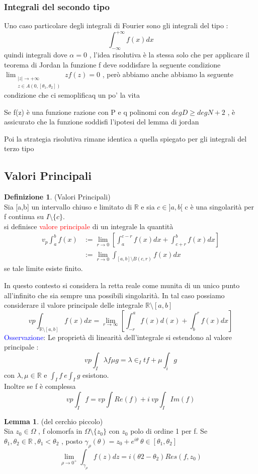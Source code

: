 \documentclass{article}
\theoremstyle{definition}
\newtheorem*{definizione}{Definizione}
\newtheorem*{lemma}{Lemma}
\newcommand{\R}{\mathbb{R}}
\newcommand{\la}{\lambda}
\newcommand{\intinf}{\int_{-\infty}^{+\infty}}
\begin{document}
\subsubsection{Integrali del secondo tipo}
Uno caso particolare degli integrali di Fourier sono gli integrali del tipo : 
$$\intinf f(x)dx$$ quindi integrali dove $\alpha=0$ , l'idea risolutiva è la stessa solo che per applicare il teorema di Jordan la funzione f deve soddisfare la seguente condizione  $\lim_{\substack{|z| \to +\infty \\ z \in A(0, [\theta_1, \theta_2])}}zf(z)=0$ , però abbiamo anche abbiamo la seguente condizione che ci semoplificaq un po' la vita 
\begin{tcolorbox}
	Se f(z) è una funzione razione con P e q polinomi con $deg D \geq deg N+2$ , è assicurato che la funzione soddisfi l'ipotesi del lemma di jordan 
\end{tcolorbox}
Poi la strategia risolutiva rimane identica a quella spiegato per gli integrali del terzo tipo 
\newpage
\subsection{Valori Principali}
\begin{definizione}(Valori Principali)\\
	Sia [a,b] un intervallo chiuso e limitato di $\R$ e sia $c \in ]a,b[$ c è una singolarità per f continua su $I\setminus \{c\}$. \\ si definisce \textcolor{red}{valore principale} di un integrale la quantità 
	\begin{align*}
		v_p\int_{a}^{b}f(x)&:= \lim_{r \rightarrow 0} \left[\int_{a}^{c-r}f(x)dx+\int_{c+r}^{b}f(x)dx\right] \\
		&:=  \lim_{r \rightarrow 0} \int_{[a,b]\setminus B(c,r)} f(x)dx
		\end{align*}
		se tale limite esiste finito.
\end{definizione}
In questo contesto si considera la retta reale come munita di un unico punto all'infinito che sia sempre una possibili singolarità. In tal caso possiamo considerare il valore principale delle integrale $\R\setminus [a,b]$ 
$$vp \int_{\R \setminus [a,b]}f(x)dx=\lim_{r \rightarrow \infty}\left[\int_{-r}^{a}f(x)d(x)+\int_{b}^rf(x)dx\right]$$
\textcolor{blue}{Osservazione}: Le proprietà di linearità dell'integrale si estendono al valore principale : 
$$vp\int_I \la f \mu g= \la \in_It f + \mu \int_i g$$
con $\la,\mu \in \R$ e  $\int _I f \ e \int _I g$ esistono. \\
Inoltre se f è complessa 
$$vp \int_I f= vp \int Re(f) + i \ vp \int_I Im(f)$$
\begin{tcolorbox}

\begin{lemma}(del cerchio piccolo) \\
	Sia $z_0\in \Omega $ , f olomorfa in $\Omega \setminus \{z_0\}$  con $z_0$ polo di ordine 1 per f. Se $\theta_1 , \theta_2 \in \R \ , \theta_1 < \theta_2$ , posto $\gamma_\rho(\theta)=z_0+e^{i\theta} \ \theta \in [\theta_1,\theta_2]$ 
	$$\lim_{\rho \rightarrow 0^+} \int_{\gamma_{\rho}}f(z)dz= i (\theta2 -\theta_2)Res(f,z_0) $$
\end{lemma}
\end{tcolorbox}
\newpage
\end{document}
